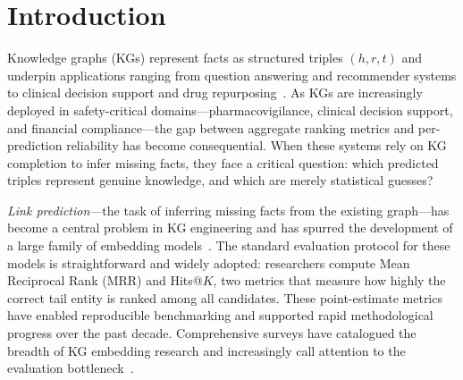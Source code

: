 \section{Introduction}
\label{sec:intro}

Knowledge graphs (KGs) represent facts as structured triples $(h, r, t)$ and underpin applications ranging from question answering and recommender systems to clinical decision support and drug repurposing~\cite{shen2022comprehensive,biswas2023knowledge}.
As KGs are increasingly deployed in safety-critical domains---pharmacovigilance, clinical decision support, and financial compliance---the gap between aggregate ranking metrics and per-prediction reliability has become consequential.
When these systems rely on KG completion to infer missing facts, they face a critical question: which predicted triples represent genuine knowledge, and which are merely statistical guesses?

\emph{Link prediction}---the task of inferring missing facts from the existing graph---has become a central problem in KG engineering and has spurred the development of a large family of embedding models~\cite{bordes2013translating, sun2019rotate, trouillon2016complex, dettmers2018convolutional, balazevic2019tucker, nguyen2018convkb, sun2022hake, le2023knowledge}.
The standard evaluation protocol for these models is straightforward and widely adopted: researchers compute Mean Reciprocal Rank (MRR) and Hits@$K$, two metrics that measure how highly the correct tail entity is ranked among all candidates. These point-estimate metrics have enabled reproducible benchmarking and supported rapid methodological progress over the past decade. Comprehensive surveys have catalogued the breadth of KG embedding research and increasingly call attention to the evaluation bottleneck~\cite{wang2017knowledge,rossi2021knowledge,li2023knowledge,liu2022understanding,biswas2023knowledge}.

